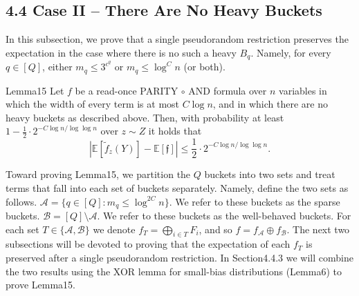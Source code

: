 \subsection*{4.4 Case II -- There Are No Heavy Buckets}
In this subsection, we prove that a single pseudorandom restriction preserves the expectation in the case where there is no such a heavy $B_q$. Namely, for every $q\in[Q]$, either $m_q\le3^{c^q}$ or $m_q\le\log^C n$ (or both).
\begin{authorclaim}{Lemma15}
Let $f$ be a read-once PARITY $\circ$ AND formula over $n$ variables in which the width of every term is at most $C\log n$, and in which there are no heavy buckets as described above. Then, with probability at least $1-\frac12\cdot2^{-C\log n/\log\log n}$ over $z\sim Z$ it holds that
\[
|\mathbb E[\widetilde f_z(Y)]-\mathbb E[\mathfrak f]|
\le\frac12\cdot2^{-C\log n/\log\log n}.
\]
\end{authorclaim}
Toward proving Lemma15, we partition the $Q$ buckets into two sets and treat terms that fall into each set of buckets separately. Namely, define the two sets as follows. $\mathcal A=\{q\in[Q]:m_q\le\log^{2C}n\}$. We refer to these buckets as the sparse buckets. $\mathcal B=[Q]\setminus\mathcal A$. We refer to these buckets as the well-behaved buckets.
For each set $T\in\{\mathcal A,\mathcal B\}$ we denote $f_T=\bigoplus_{i\in T}F_i$, and so $f=f_{\mathcal A}\oplus f_{\mathcal B}$. The next two subsections will be devoted to proving that the expectation of each $f_T$ is preserved after a single pseudorandom restriction. In Section4.4.3 we will combine the two results using the XOR lemma for small-bias distributions (Lemma6) to prove Lemma15.
